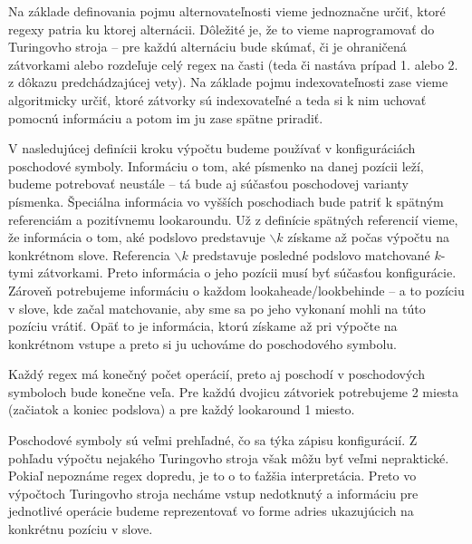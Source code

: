 Na základe definovania pojmu alternovateľnosti vieme jednoznačne určiť, ktoré regexy patria ku ktorej alternácii. Dôležité je, že to vieme naprogramovať do Turingovho stroja -- pre každú alternáciu bude skúmať, či je ohraničená zátvorkami alebo rozdeľuje celý regex na časti (teda či nastáva prípad 1. alebo 2. z dôkazu predchádzajúcej vety). Na základe pojmu indexovateľnosti zase vieme algoritmicky určiť, ktoré zátvorky sú indexovateľné a teda si k nim uchovať pomocnú informáciu a potom im ju zase spätne priradiť.

V nasledujúcej definícii kroku výpočtu budeme používať v konfiguráciách poschodové symboly. Informáciu o tom, aké písmenko na danej pozícii leží, budeme potrebovať neustále -- tá bude aj súčasťou poschodovej varianty písmenka. Špeciálna informácia vo vyšších poschodiach bude patriť k spätným referenciám a pozitívnemu lookaroundu. Už z definície spätných referencií vieme, že informácia o tom, aké podslovo predstavuje $\backslash k$ získame až počas výpočtu na konkrétnom slove. Referencia $\backslash k$ predstavuje posledné podslovo matchované $k$-tymi zátvorkami. Preto informácia o jeho pozícii musí byť súčasťou konfigurácie. Zároveň potrebujeme informáciu o každom lookaheade/look\-behinde -- a to pozíciu v slove, kde začal matchovanie, aby sme sa po jeho vykonaní mohli na túto pozíciu vrátiť. Opäť to je informácia, ktorú získame až pri výpočte na konkrétnom vstupe a preto si ju uchováme do poschodového symbolu.

Každý regex má konečný počet operácií, preto aj poschodí v poschodových symboloch bude konečne veľa. Pre každú dvojicu zátvoriek potrebujeme 2 miesta (začiatok a koniec podslova) a pre každý lookaround 1 miesto.

Poschodové symboly sú veľmi prehľadné, čo sa týka zápisu konfigurácií. Z pohľadu výpočtu nejakého Turingovho stroja však môžu byť veľmi nepraktické. Pokiaľ nepoznáme regex dopredu, je to o to ťažšia interpretácia. Preto vo výpočtoch Turingovho stroja necháme vstup nedotknutý a informáciu pre jednotlivé operácie budeme reprezentovať vo forme adries ukazujúcich na konkrétnu pozíciu v slove.

